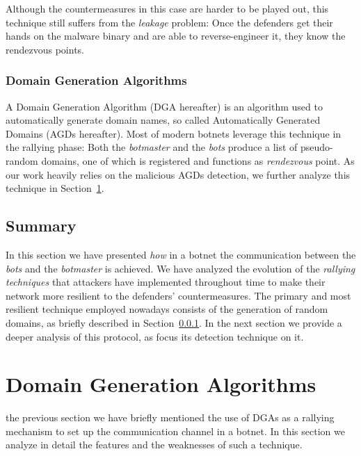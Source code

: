 Although the countermeasures in this case are harder to be played out, this technique
still suffers from the \emph{leakage} problem: Once the defenders get their hands
on the malware binary and are able to reverse-engineer it, they know the
rendezvous points.


\subsubsection{Domain Generation Algorithms} %
\label{ssub:domain_generation_algorithm}
A Domain Generation Algorithm (DGA hereafter) is an algorithm used to automatically
generate domain names, so called Automatically Generated Domains (AGDs hereafter).
Most of modern botnets leverage this technique in the rallying
phase: Both the \emph{botmaster} and the \emph{bots} produce a list of pseudo-random domains, one
of which is registered and functions as \emph{rendezvous} point. As our work heavily
relies on the malicious AGDs detection, we further analyze this technique in
Section~\ref{sec:domain_generation_algorithms}.





\subsection*{Summary} %
\label{sub:comm_summary}
In this section we have presented \emph{how} in a botnet the communication
between the \emph{bots} and the \emph{botmaster} is achieved. We have analyzed
the evolution of the \emph{rallying techniques} that attackers have implemented
throughout time to make their network more resilient to the defenders'
countermeasures. The primary and most resilient technique employed nowadays
consists of the generation of random domains, as briefly described
in Section~\ref{ssub:domain_generation_algorithm}. In the next section we provide
a deeper analysis of this protocol, as \thesystem focus its detection technique on it.


\section{Domain Generation Algorithms} %
\label{sec:domain_generation_algorithms}
 the previous section we have briefly mentioned the use
of DGAs as a rallying mechanism to set up
the communication channel in a botnet. In this section we analyze in
detail the features and the weaknesses of such a technique.

